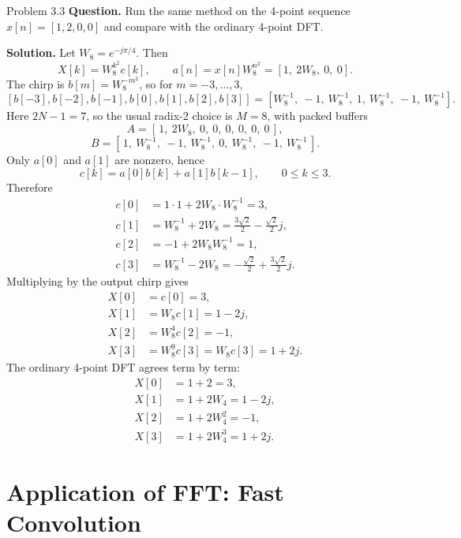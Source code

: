 \documentclass[10pt]{article}
\newcommand{\Prompt}[1]{\textbf{Question.} #1}
\newcommand{\SketchLabel}{\tcblower\textbf{Solution.}}
\begin{document}
\begin{examplebox}{Problem 3.3}
  \Prompt{Run the same method on the 4-point sequence \(x[n]=[1,2,0,0]\) and compare with the ordinary 4-point DFT.}

  \medskip
  \SketchLabel{}
  Let \(W_8=e^{-j\pi/4}\). Then
  \[
    X[k]=W_8^{k^2}c[k],\qquad
    a[n]=x[n]W_8^{n^2}=[1,\ 2W_8,\ 0,\ 0].
  \]
  The chirp is \(b[m]=W_8^{-m^2}\), so for \(m=-3,\ldots,3\),
  \[
    [b[-3],b[-2],b[-1],b[0],b[1],b[2],b[3]]
    =[W_8^{-1},\ -1,\ W_8^{-1},\ 1,\ W_8^{-1},\ -1,\ W_8^{-1}].
  \]
  Here \(2N-1=7\), so the usual radix-2 choice is \(M=8\), with packed buffers
  \[
    A=[\,1,\ 2W_8,\ 0,\ 0,\ 0,\ 0,\ 0,\ 0\,],
  \]
  \[
    B=[\,1,\ W_8^{-1},\ -1,\ W_8^{-1},\ 0,\ W_8^{-1},\ -1,\ W_8^{-1}\,].
  \]
  Only \(a[0]\) and \(a[1]\) are nonzero, hence
  \[
    c[k]=a[0]b[k]+a[1]b[k-1],\qquad 0\le k\le 3.
  \]
  Therefore
  \[
    \begin{aligned}
      c[0]&=1\cdot 1+2W_8\cdot W_8^{-1}=3,\\
      c[1]&=W_8^{-1}+2W_8
      =\frac{3\sqrt2}{2}-\frac{\sqrt2}{2}j,\\
      c[2]&=-1+2W_8W_8^{-1}=1,\\
      c[3]&=W_8^{-1}-2W_8
      =-\frac{\sqrt2}{2}+\frac{3\sqrt2}{2}j.
    \end{aligned}
  \]
  Multiplying by the output chirp gives
  \[
    \begin{aligned}
      X[0]&=c[0]=3,\\
      X[1]&=W_8c[1]=1-2j,\\
      X[2]&=W_8^4c[2]=-1,\\
      X[3]&=W_8^9c[3]=W_8c[3]=1+2j.
    \end{aligned}
  \]
  The ordinary 4-point DFT agrees term by term:
  \[
    \begin{aligned}
      X[0]&=1+2=3,\\
      X[1]&=1+2W_4=1-2j,\\
      X[2]&=1+2W_4^2=-1,\\
      X[3]&=1+2W_4^3=1+2j.
    \end{aligned}
  \]

\end{examplebox}

\newpage

\section{Application of FFT: Fast Convolution}
\end{document}

